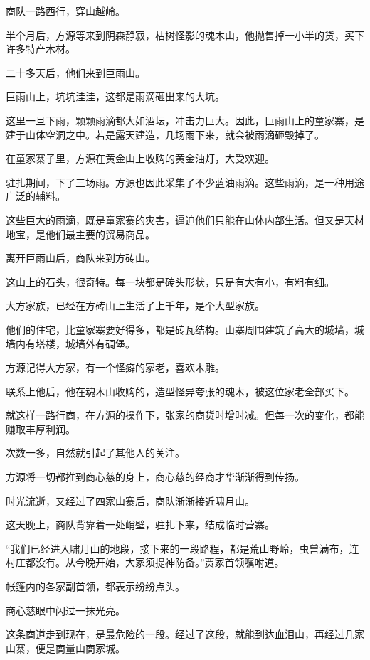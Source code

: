 
\begin{this_body}

商队一路西行，穿山越岭。

半个月后，方源等来到阴森静寂，枯树怪影的魂木山，他抛售掉一小半的货，买下许多特产木材。

二十多天后，他们来到巨雨山。

巨雨山上，坑坑洼洼，这都是雨滴砸出来的大坑。

这里一旦下雨，颗颗雨滴都大如酒坛，冲击力巨大。因此，巨雨山上的童家寨，是建于山体空洞之中。若是露天建造，几场雨下来，就会被雨滴砸毁掉了。

在童家寨子里，方源在黄金山上收购的黄金油灯，大受欢迎。

驻扎期间，下了三场雨。方源也因此采集了不少蓝油雨滴。这些雨滴，是一种用途广泛的辅料。

这些巨大的雨滴，既是童家寨的灾害，逼迫他们只能在山体内部生活。但又是天材地宝，是他们最主要的贸易商品。

离开巨雨山后，商队来到方砖山。

这山上的石头，很奇特。每一块都是砖头形状，只是有大有小，有粗有细。

大方家族，已经在方砖山上生活了上千年，是个大型家族。

他们的住宅，比童家寨要好得多，都是砖瓦结构。山寨周围建筑了高大的城墙，城墙内有塔楼，城墙外有碉堡。

方源记得大方家，有一个怪癖的家老，喜欢木雕。

联系上他后，他在魂木山收购的，造型怪异夸张的魂木，被这位家老全部买下。

就这样一路行商，在方源的操作下，张家的商货时增时减。但每一次的变化，都能赚取丰厚利润。

次数一多，自然就引起了其他人的关注。

方源将一切都推到商心慈的身上，商心慈的经商才华渐渐得到传扬。

时光流逝，又经过了四家山寨后，商队渐渐接近啸月山。

这天晚上，商队背靠着一处峭壁，驻扎下来，结成临时营寨。

“我们已经进入啸月山的地段，接下来的一段路程，都是荒山野岭，虫兽满布，连村庄都没有。从今晚开始，大家须提神防备。”贾家首领嘱咐道。

帐篷内的各家副首领，都表示纷纷点头。

商心慈眼中闪过一抹光亮。

这条商道走到现在，是最危险的一段。经过了这段，就能到达血泪山，再经过几家山寨，便是商量山商家城。


\end{this_body}
